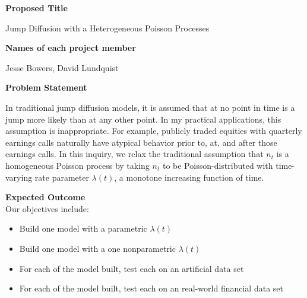 \documentclass[12pt]{article}
\newcommand{\myheading}[1]{\Large{\bf{#1}}}
\begin{document}
{\myheading {Proposed Title}} 

Jump Diffusion with a Heterogeneous Poisson Processes

\bigskip

{\myheading {Names of each project member}}

Jesse Bowers, David Lundquist

\bigskip


{\myheading {Problem Statement}}

In traditional jump diffusion models, it is assumed that at no point in time is a jump more likely than at any other point.  In my practical applications, this assumption is inappropriate.  For example, publicly traded equities with quarterly earnings calls naturally have atypical behavior prior to, at, and after those earnings calls.  In this inquiry, we relax the traditional assumption that $n_{t}$ is a homogeneous Poisson process by taking $n_{t}$ to be Poisson-distributed with time-varying rate parameter $\lambda(t)$, a monotone increasing function of time.

\bigskip


{\myheading {Expected Outcome}} \\
Our objectives include:
\begin{itemize}  
\item Build one model with a parametric $\lambda(t)$
\item Build one model with a one nonparametric $\lambda(t)$
\item For each of the model built, test each on an artificial data set
\item For each of the model built, test each on an real-world financial data set

\end{itemize}

\bigskip
\end{document}
